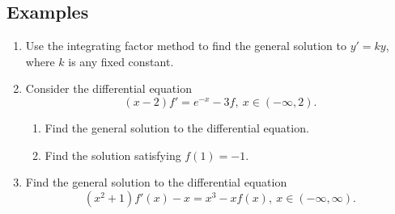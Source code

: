 \documentclass[11pt]{article}
\theoremstyle{definition}
\theoremstyle{named}
\numberwithin{myalgctr}{section}
\begin{document}
\subsection*{Examples}
\begin{enumerate}
  \item Use the integrating factor method to find the general solution to $y'=k y$, where $k$ is any fixed constant.
  \item Consider the differential equation
  \[
  (x-2)f'=e^{-x}-3f, \ x\in (-\infty, 2).
  \]
  \begin{enumerate}
    \item Find the general solution to the differential equation.
    \item Find the solution satisfying $f(1)=-1$.
  \end{enumerate}
  \item Find the general solution to the differential equation
  \[
  (x^2+1)f'(x)-x=x^3-xf(x), \  x\in (-\infty, \infty).
  \]
\end{enumerate}
\end{document}
